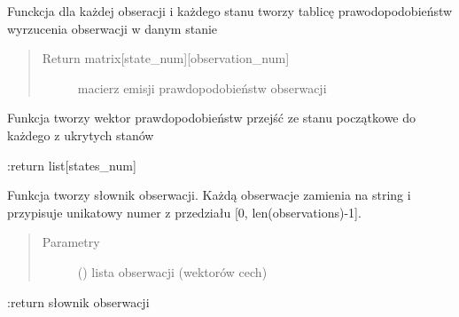 \documentclass[letterpaper,10pt,polish]{sphinxmanual}
\begin{document}
\begin{fulllineitems}

\begin{fulllineitems}
\label{\detokenize{HMM:HMM.HMM.create_emission_ppb}}
Funckcja dla każdej obseracji i każdego stanu tworzy tablicę prawodopodobieństw wyrzucenia obserwacji w
danym stanie
\begin{quote}\begin{description}
\item[{Return matrix{[}state\_num{]}{[}observation\_num{]}}] \leavevmode
macierz emisji prawdopodobieństw obserwacji

\end{description}\end{quote}

\end{fulllineitems}


\begin{fulllineitems}
\label{\detokenize{HMM:HMM.HMM.create_initial_ppb}}
Funkcja tworzy wektor prawdopodobieństw przejść ze stanu początkowe do każdego z ukrytych stanów

:return list{[}states\_num{]}

\end{fulllineitems}


\begin{fulllineitems}
\label{\detokenize{HMM:HMM.HMM.create_observation_dict}}
Funkcja tworzy słownik obserwacji. Każdą obserwacje zamienia na string i przypisuje unikatowy
numer z przedziału {[}0, len(observations)-1{]}.
\begin{quote}\begin{description}
\item[{Parametry}] \leavevmode
{} () \textendash{} lista obserwacji (wektorów cech)

\end{description}\end{quote}

:return słownik obserwacji

\end{fulllineitems}


\end{fulllineitems}
\end{document}
